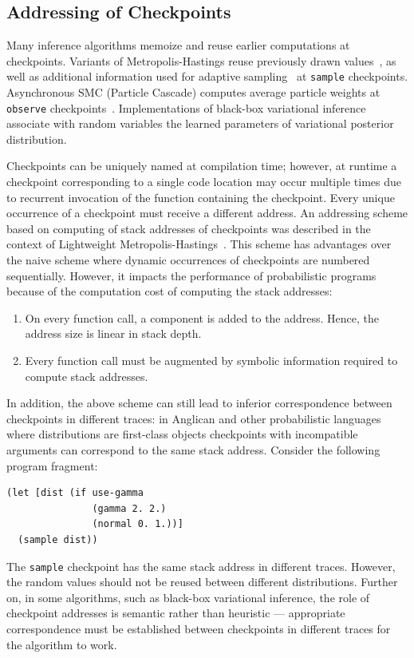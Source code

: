 \documentclass[preprint]{sigplanconf}
\begin{document}
\subsection{Addressing of Checkpoints}
\label{sec:addressing}

Many inference algorithms memoize and reuse earlier computations
at checkpoints. Variants of Metropolis-Hastings reuse previously
drawn values~\cite{WSG11}, as well as additional information
used for adaptive sampling~\cite{TMP+15} at \texttt{sample}
checkpoints. Asynchronous SMC (Particle Cascade) computes
average particle weights at \texttt{observe}
checkpoints~\cite{PWD+14}. Implementations of black-box
variational inference~\cite{WW13,MPT+16} associate with random
variables the learned parameters of variational posterior
distribution.

Checkpoints can be uniquely named at compilation time;
however, at runtime a checkpoint corresponding to a single code
location may occur multiple times due to recurrent invocation of
the function containing the checkpoint. Every unique occurrence
of a checkpoint must receive a different address. An addressing
scheme based on computing of stack addresses of checkpoints was
described in the context of Lightweight
Metropolis-Hastings~\cite{WSG11}.  This scheme has advantages
over the naive scheme where dynamic occurrences of checkpoints
are numbered sequentially. However, it impacts the
performance of probabilistic programs because of the computation
cost of computing the stack addresses:
\begin{enumerate}
    \item On every function call, a component is added to the
        address. Hence, the address size is linear in stack depth.
    \item Every function call must be augmented by symbolic
        information required to compute stack addresses.
\end{enumerate}
In addition, the above scheme can still lead to inferior
correspondence between checkpoints in different traces: in
Anglican and other probabilistic languages where distributions
are first-class objects checkpoints with incompatible arguments
can correspond to the same stack address. Consider the following
program fragment:
\begin{lstlisting}[style=default]
(let [dist (if use-gamma
               (gamma 2. 2.)
               (normal 0. 1.))]
  (sample dist))
\end{lstlisting}
The \texttt{sample} checkpoint has the same stack address in
different traces. However, the random values should not be
reused between different distributions. Further on, in some
algorithms, such as black-box variational inference, the role of
checkpoint addresses is semantic rather than heuristic ---
appropriate correspondence must be established
between checkpoints in different traces for the algorithm to
work.
\end{document}

